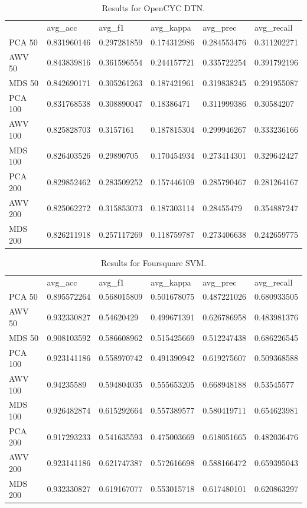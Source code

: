 \begin{table}[]
	\begin{tabular}{llllll}
		& avg\_acc    & avg\_f1     & avg\_kappa  & avg\_prec   & avg\_recall \\
		PCA 50  & 0.831960146 & 0.297281859 & 0.174312986 & 0.284553476 & 0.311202271 \\
		AWV 50  & 0.843839816 & 0.361596554 & 0.244157721 & 0.335722254 & 0.391792196 \\
		MDS 50  & 0.842690171 & 0.305261263 & 0.187421961 & 0.319838245 & 0.291955087 \\
		PCA 100 & 0.831768538 & 0.308890047 & 0.18386471  & 0.311999386 & 0.30584207  \\
		AWV 100 & 0.825828703 & 0.3157161   & 0.187815304 & 0.299946267 & 0.333236166 \\
		MDS 100 & 0.826403526 & 0.29890705  & 0.170454934 & 0.273414301 & 0.329642427 \\
		PCA 200 & 0.829852462 & 0.283509252 & 0.157446109 & 0.285790467 & 0.281264167 \\
		AWV 200 & 0.825062272 & 0.315853073 & 0.187303114 & 0.28455479  & 0.354887247 \\
		MDS 200 & 0.826211918 & 0.257117269 & 0.118759787 & 0.273406638 & 0.242659775
	\end{tabular}
	\caption{Results for OpenCYC DTN.}
	\label{table:Newsgroups}
\end{table}

\begin{table}[]
	\begin{tabular}{llllll}
		& avg\_acc    & avg\_f1     & avg\_kappa  & avg\_prec   & avg\_recall \\
		PCA 50  & 0.895572264 & 0.568015809 & 0.501678075 & 0.487221026 & 0.680933505 \\
		AWV 50  & 0.932330827 & 0.54620429  & 0.499671391 & 0.626786958 & 0.483981376 \\
		MDS 50  & 0.908103592 & 0.586608962 & 0.515425669 & 0.512247438 & 0.686226545 \\
		PCA 100 & 0.923141186 & 0.558970742 & 0.491390942 & 0.619275607 & 0.509368588 \\
		AWV 100 & 0.94235589  & 0.594804035 & 0.555653205 & 0.668948188 & 0.53545577  \\
		MDS 100 & 0.926482874 & 0.615292664 & 0.557389577 & 0.580419711 & 0.654623981 \\
		PCA 200 & 0.917293233 & 0.541635593 & 0.475003669 & 0.618051665 & 0.482036476 \\
		AWV 200 & 0.923141186 & 0.621747387 & 0.572616698 & 0.588166472 & 0.659395043 \\
		MDS 200 & 0.932330827 & 0.619167077 & 0.553015718 & 0.617480101 & 0.620863297
	\end{tabular}
	\caption{Results for Foursquare SVM.}
	\label{table:Newsgroups}
\end{table}

